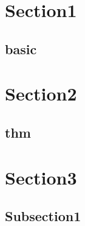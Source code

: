 \section{Section1}
    \subsection{basic}
        

\section{Section2}
    \subsection{thm}
        
        
\section{Section3}
    \subsection{Subsection1}
        

